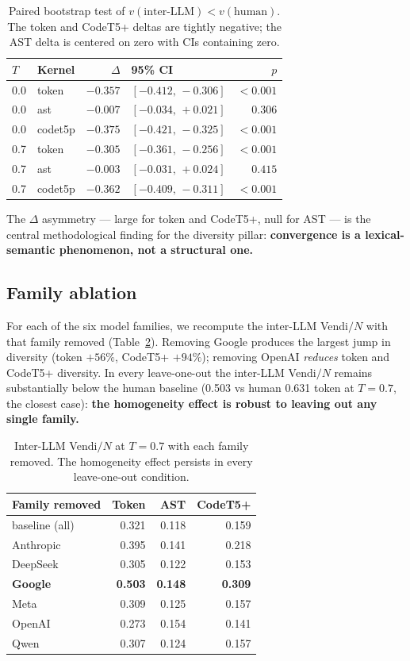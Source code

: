 \documentclass{article}
\begin{document}
\begin{table}[h]
\centering
\small
\begin{tabular}{llrlr}
\toprule
$T$ & Kernel & $\Delta$ & 95\% CI & $p$ \\
\midrule
0.0 & token   & $-0.357$ & $[-0.412,\,-0.306]$ & $<\!0.001$ \\
0.0 & ast     & $-0.007$ & $[-0.034,\,+0.021]$ & $0.306$ \\
0.0 & codet5p & $-0.375$ & $[-0.421,\,-0.325]$ & $<\!0.001$ \\
0.7 & token   & $-0.305$ & $[-0.361,\,-0.256]$ & $<\!0.001$ \\
0.7 & ast     & $-0.003$ & $[-0.031,\,+0.024]$ & $0.415$ \\
0.7 & codet5p & $-0.362$ & $[-0.409,\,-0.311]$ & $<\!0.001$ \\
\bottomrule
\end{tabular}
\caption{Paired bootstrap test of $v(\text{inter-LLM}) < v(\text{human})$.
The token and CodeT5+ deltas are tightly negative; the AST delta is centered
on zero with CIs containing zero.}
\label{tab:pillar2}
\end{table}

The $\Delta$ asymmetry --- large for token and CodeT5+, null for AST --- is
the central methodological finding for the diversity pillar:
\textbf{convergence is a lexical-semantic phenomenon, not a structural one.}

\subsection{Family ablation}

For each of the six model families, we recompute the inter-LLM Vendi$/N$
with that family removed (Table~\ref{tab:fam}). Removing Google produces
the largest jump in diversity (token $+56\%$, CodeT5+ $+94\%$); removing
OpenAI \emph{reduces} token and CodeT5+ diversity. In every leave-one-out
the inter-LLM Vendi$/N$ remains substantially below the human baseline
(0.503 vs human 0.631 token at $T=0.7$, the closest case): \textbf{the
homogeneity effect is robust to leaving out any single family.}

\begin{table}[h]
\centering
\small
\begin{tabular}{lrrr}
\toprule
Family removed & Token & AST & CodeT5+ \\
\midrule
baseline (all)  & 0.321 & 0.118 & 0.159 \\
Anthropic       & 0.395 & 0.141 & 0.218 \\
DeepSeek        & 0.305 & 0.122 & 0.153 \\
\textbf{Google} & \textbf{0.503} & \textbf{0.148} & \textbf{0.309} \\
Meta            & 0.309 & 0.125 & 0.157 \\
OpenAI          & 0.273 & 0.154 & 0.141 \\
Qwen            & 0.307 & 0.124 & 0.157 \\
\bottomrule
\end{tabular}
\caption{Inter-LLM Vendi$/N$ at $T=0.7$ with each family removed. The
homogeneity effect persists in every leave-one-out condition.}
\label{tab:fam}
\end{table}
\end{document}
